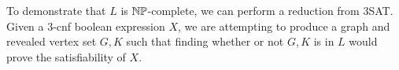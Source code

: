 \documentclass[11pt, reqno]{amsart}
\theoremstyle{plain}
\theoremstyle{definition}
\newcounter{r}
\begin{document}
\begin{enumerate}

    To demonstrate that $L$ is $\mathbb{N}\mathbb{P}$-complete, we can perform a reduction
    from 3SAT. Given a 3-cnf boolean expression $X$, we are attempting
    to produce a graph and revealed vertex set $G, K$ such that finding whether
    or not $G, K$ is in $L$ would prove the satisfiability of $X$.
\end{enumerate}
\end{document}
